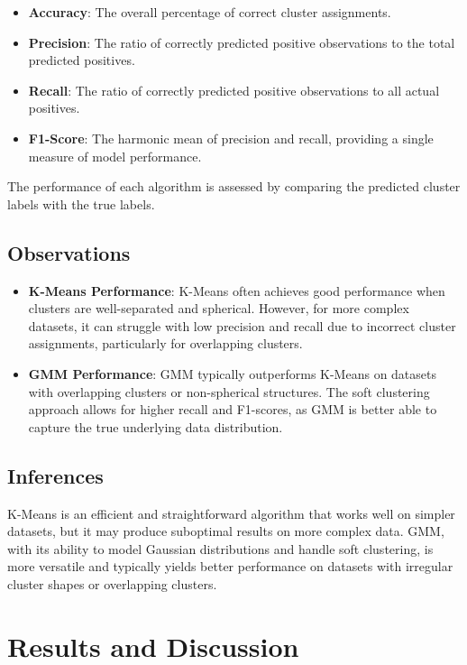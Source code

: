 \documentclass[conference]{IEEEtran}
\begin{document}
	\begin{itemize}
		\item \textbf{Accuracy}: The overall percentage of correct cluster assignments.
		\item \textbf{Precision}: The ratio of correctly predicted positive observations to the total predicted positives.
		\item \textbf{Recall}: The ratio of correctly predicted positive observations to all actual positives.
		\item \textbf{F1-Score}: The harmonic mean of precision and recall, providing a single measure of model performance.
	\end{itemize}
	
	The performance of each algorithm is assessed by comparing the predicted cluster labels with the true labels.
	
	\subsection{Observations}
	
	\begin{itemize}
		\item \textbf{K-Means Performance}: K-Means often achieves good performance when clusters are well-separated and spherical. However, for more complex datasets, it can struggle with low precision and recall due to incorrect cluster assignments, particularly for overlapping clusters.
		\item \textbf{GMM Performance}: GMM typically outperforms K-Means on datasets with overlapping clusters or non-spherical structures. The soft clustering approach allows for higher recall and F1-scores, as GMM is better able to capture the true underlying data distribution.
	\end{itemize}
	
	\subsection{Inferences}
	
	K-Means is an efficient and straightforward algorithm that works well on simpler datasets, but it may produce suboptimal results on more complex data. GMM, with its ability to model Gaussian distributions and handle soft clustering, is more versatile and typically yields better performance on datasets with irregular cluster shapes or overlapping clusters.
	
	
	\section{Results and Discussion}
	
\end{document}
